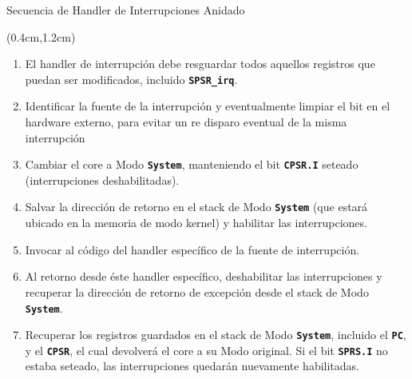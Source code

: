 \documentclass[table,x11names,aspectratio=169]{beamer}
\begin{document}
\begin{frame}{Secuencia de Handler de Interrupciones Anidado}
 \begin{textblock*}{\textwidth}(0.4cm,1.2cm)
  \begin{enumerate}[<+(1)->]\justifying %
   \item El handler de interrupción debe resguardar todos aquellos registros que puedan ser modificados, incluido \textbf{\texttt{SPSR\_irq}}.
   \item Identificar la fuente de la interrupción y eventualmente limpiar el bit en el hardware externo, para evitar un re disparo eventual de la misma interrupción
   \item Cambiar el core a Modo \texttt{\textbf{System}}, manteniendo el bit \textbf{\texttt{CPSR.I}} seteado (interrupciones deshabilitadas).
   \item Salvar la dirección de retorno en el stack de Modo \texttt{\textbf{System}} (que estará ubicado en la memoria de modo kernel) y habilitar las interrupciones.
   \item Invocar al código del handler específico de la fuente de interrupción.
   \item Al retorno desde éste handler específico, deshabilitar las interrupciones y recuperar la dirección de retorno de excepción desde el stack de Modo \texttt{\textbf{System}}.
   \item Recuperar los registros guardados en el stack de Modo \texttt{\textbf{System}}, incluido el \textbf{\texttt{PC}}, y el \textbf{\texttt{CPSR}}, el cual devolverá el core a su Modo original. Si el bit \textbf{\texttt{SPRS.I}} no estaba seteado, las interrupciones quedarán nuevamente habilitadas.
  \end{enumerate}
 \end{textblock*}
\end{frame}
\end{document}
